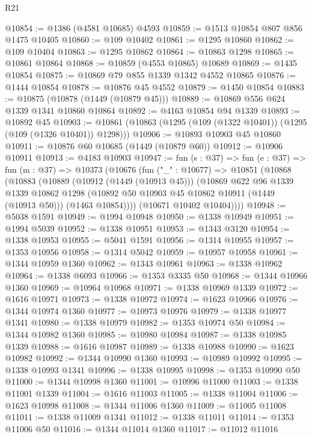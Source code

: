 \begin{lexlean}{R21}
\begin{coremodule}
@10854 := @1386 (@4581 @10685) @4593
@10859 := @1513 @10854 @807 @856 @1475 @10405
@10860 := @109 @10402
@10861 := @1295 @10860
@10862 := @109 @10404
@10863 := @1295 @10862
@10864 := @10863 @1298
@10865 := @10861 @10864
@10868 := @10859 (@4553 @10865) @10689
@10869 := @1435 @10854
@10875 := @10869 @79 @855 @1339 @1342 @4552 @10865
@10876 := @1444 @10854
@10878 := @10876 @45 @4552
@10879 := @1450 @10854
@10883 := @10875 (@10878 (@1449 (@10879 @45)))
@10889 := @10869 @556 @624 @1339 @1341 @10860 @10864
@10892 := @4163 @10854 @94 @1339
@10893 := @10892 @45
@10903 := @10861 (@10863 (@1295 (@109 (@1322 @10401)) (@1295 (@109 (@1326 @10401)) @1298)))
@10906 := @10893 @10903 @45 @10860
@10911 := @10876 @60 @10685 (@1449 (@10879 @60))
@10912 := @10906 @10911
@10913 := @4183 @10903
@10947 := fun (s : @37) =>
  fun (e : @37) =>
  fun (m : @37) =>
  @10373
    (@10676
      (fun ("_" : @10677) =>
      @10851
        (@10868
          (@10883
            (@10889
              (@10912 (@1449 (@10913 @45)))
              (@10869
                @622
                @96
                @1339
                @1339
                @10862
                @1298
                (@10892 @50 @10903 @45 @10862 @10911 (@1449 (@10913 @50)))
                (@1463 @10854))))
          (@10671 @10402 @10404))))
@10948 := @5038 @1591
@10949 := @1994 @10948
@10950 := @1338 @10949
@10951 := @1994 @5039
@10952 := @1338 @10951
@10953 := @1343 @3120
@10954 := @1338 @10953
@10955 := @5041 @1591
@10956 := @1314 @10955
@10957 := @1353 @10956
@10958 := @1314 @5042
@10959 := @10957 @10958
@10961 := @1344 @10959 @1360
@10962 := @1343 @10961
@10963 := @1338 @10962
@10964 := @1338 @6093
@10966 := @1353 @3335 @50
@10968 := @1344 @10966 @1360
@10969 := @10964 @10968
@10971 := @1338 @10969 @1339
@10972 := @1616 @10971
@10973 := @1338 @10972
@10974 := @1623 @10966
@10976 := @1344 @10974 @1360
@10977 := @10973 @10976
@10979 := @1338 @10977 @1341
@10980 := @1338 @10979
@10982 := @1353 @10974 @50
@10984 := @1344 @10982 @1360
@10985 := @10980 @10984
@10987 := @1338 @10985 @1339
@10988 := @1616 @10987
@10989 := @1338 @10988
@10990 := @1623 @10982
@10992 := @1344 @10990 @1360
@10993 := @10989 @10992
@10995 := @1338 @10993 @1341
@10996 := @1338 @10995
@10998 := @1353 @10990 @50
@11000 := @1344 @10998 @1360
@11001 := @10996 @11000
@11003 := @1338 @11001 @1339
@11004 := @1616 @11003
@11005 := @1338 @11004
@11006 := @1623 @10998
@11008 := @1344 @11006 @1360
@11009 := @11005 @11008
@11011 := @1338 @11009 @1341
@11012 := @1338 @11011
@11014 := @1353 @11006 @50
@11016 := @1344 @11014 @1360
@11017 := @11012 @11016

\end{coremodule}
\end{lexlean}

